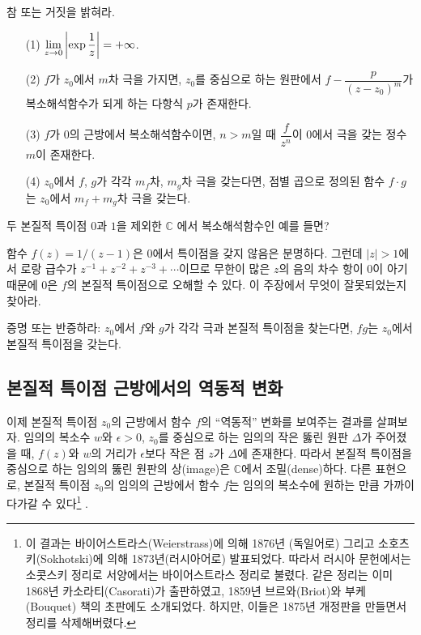 \begin{salt_exercise}\label{ex-4-35}
참 또는 거짓을 밝혀라.
\begin{itemize}
\item[(1)] $\lim\limits_{z\to 0} \left| \exp \displaystyle\frac1z \right| = +\infty$.
\item[(2)] $f$가 $z_0$에서 $m$차 극을 가지면, 
$z_0$를 중심으로 하는 원판에서
$f - \dfrac{p}{(z-z_0)^m}$가 복소해석함수가 되게 하는
다항식 $p$가 존재한다.
\item[(3)] $f$가 $0$의 근방에서 복소해석함수이면,
$n>m$일 때 $\dfrac f{z^n}$이 $0$에서 극을 갖는 정수 $m$이 존재한다.
\item[(4)] $z_0$에서 $f$, $g$가 각각 $m_f$차, $m_g$차 극을 갖는다면,
점별 곱으로 정의된 함수 $f\cdot g$는 $z_0$에서 $m_f+m_g$차 극을 갖는다.
\end{itemize}
\end{salt_exercise}

\begin{salt_exercise}\label{ex-4-36}
두 본질적 특이점 $0$과 $1$을 제외한  $\mathbb C$ 에서
복소해석함수인 예를 들면?
\end{salt_exercise}

\begin{salt_exercise}\label{ex-4-37}
함수 $f(z) = 1/(z-1)$은 $0$에서 특이점을 갖지 않음은 분명하다.
그런데 $|z|>1$에서 로랑 급수가 $z^{-1} + z^{-2} + z^{-3} + \cdots$이므로
무한이 많은 $z$의 음의 차수 항이 $0$이 아기 때문에
$0$은 $f$의 본질적 특이점으로 오해할 수 있다. 
이 주장에서 무엇이 잘못되었는지 찾아라.
\end{salt_exercise}

\begin{salt_exercise}\label{ex-4-38}
증명 또는 반증하라:
$z_0$에서 $f$와 $g$가 각각 극과 본질적 특이점을 찾는다면,
$fg$는 $z_0$에서 본질적 특이점을 갖는다.
\end{salt_exercise}

\subsection{본질적 특이점 근방에서의 역동적 변화}

이제 본질적 특이점 $z_0$의 근방에서 함수 $f$의
``역동적'' 변화를 보여주는 결과를 살펴보자. 
임의의 복소수 $w$와 $\epsilon>0$, 
$z_0$를 중심으로 하는 임의의 작은 뚫린 원판 $\Delta$가
주어졌을 때, 
$f(z)$와 $w$의 거리가 $\epsilon$보다 작은 점 $z$가
$\Delta$에 존재한다. 따라서
본질적 특이점을 중심으로 하는 임의의 뚫린 원판의 상(image)은
$\mathbb C$에서 조밀(dense)하다.
다른 표현으로, 본질적 특이점 $z_0$의 임의의 근방에서
함수 $f$는 임의의 복소수에 원하는 만큼 가까이 다가갈 수 있다\footnote{
이 결과는 바이어스트라스(Weierstrass)에 의해
1876년 (독일어로) 그리고
소호츠키(Sokhotski)에 의해 1873년(러시아어로) 발표되었다.
따라서 러시아 문헌에서는 소콧스키 정리로
서양에서는 바이어스트라스 정리로 불렸다. 
같은 정리는 이미 1868년 카소라티(Casorati)가 출판하였고,
1859년 브르와(Briot)와 부케(Bouquet) 책의 초판에도 소개되었다.
하지만, 이들은 1875년 개정판을 만들면서 정리를 삭제해버렸다.
} .

